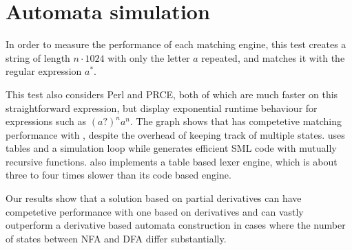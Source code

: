

\section{Automata simulation}

In order to measure the performance of each matching engine, this test creates a
string of length $n \cdot 1024$ with only the letter $a$ repeated, and matches
it with the regular expression $a^*$.


This test also considers Perl and PRCE, both of which are much faster on this
straightforward expression, but display exponential runtime behaviour for
expressions such as $(a?)^na^n$. The graph shows that \reml{} has competetive
matching performance with \mlulex{}, despite the overhead of keeping track of
multiple states. \reml{} uses tables and a simulation loop while \mlulex{}
generates efficient SML code with mutually recursive functions. \mlulex{} also
implements a table based lexer engine, which is about three to four times slower
than its code based engine.

Our results show that a solution based on partial derivatives can have
competetive performance with one based on derivatives and can vastly outperform
a derivative based automata construction in cases where the number of states
between NFA and DFA differ substantially.


